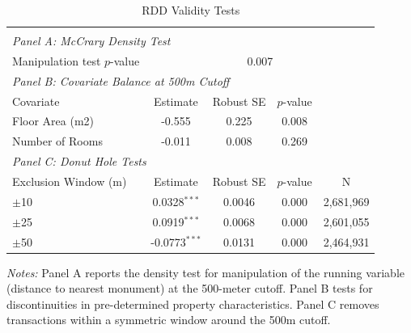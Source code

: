 \begin{table}[t]
\centering
\caption{RDD Validity Tests}
\label{tab:validity}
\begin{tabular}{lcccc}
\toprule
 & & & & \\
\multicolumn{5}{l}{\textit{Panel A: McCrary Density Test}} \\
\midrule
Manipulation test $p$-value & \multicolumn{4}{c}{0.007} \\
\midrule
\multicolumn{5}{l}{\textit{Panel B: Covariate Balance at 500m Cutoff}} \\
\midrule
Covariate & Estimate & Robust SE & $p$-value & \\
\midrule
Floor Area (m2) & -0.555 & 0.225 & 0.008 & \\
Number of Rooms & -0.011 & 0.008 & 0.269 & \\
\midrule
\multicolumn{5}{l}{\textit{Panel C: Donut Hole Tests}} \\
\midrule
Exclusion Window (m) & Estimate & Robust SE & $p$-value & N \\
\midrule
$\pm$10 & 0.0328$^{***}$ & 0.0046 & 0.000 & 2,681,969 \\
$\pm$25 & 0.0919$^{***}$ & 0.0068 & 0.000 & 2,601,055 \\
$\pm$50 & -0.0773$^{***}$ & 0.0131 & 0.000 & 2,464,931 \\
\bottomrule
\end{tabular}
\begin{tablenotes}
\item \textit{Notes:} Panel A reports the \citet{McCrary2008} density test for manipulation of the running variable (distance to nearest monument) at the 500-meter cutoff. Panel B tests for discontinuities in pre-determined property characteristics. Panel C removes transactions within a symmetric window around the 500m cutoff.
\end{tablenotes}
\end{table}
